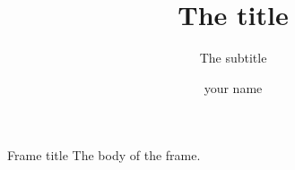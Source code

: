\documentclass[pdf]{beamer}
\title{The title}
\subtitle{The subtitle}
\author{your name}
\begin{document}
\begin{frame}
\titlepage
\end{frame}
\begin{frame}{Frame title}
The body of the frame.
\end{frame}
\end{document}
